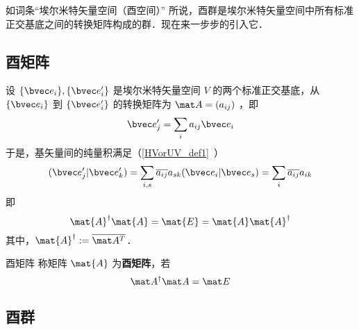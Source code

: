 
如词条“埃尔米特矢量空间（酉空间）” 所说，酉群是埃尔米特矢量空间中所有标准正交基底之间的转换矩阵构成的群．现在来一步步的引入它．
\subsection{酉矩阵}
设 $\{\bvec e_i\},\{\bvec e'_i\}$ 是埃尔米特矢量空间 $V$ 的两个标准正交基底，从 $\{\bvec e_i\}$ 到 $\{\bvec e'_i\}$ 的转换矩阵为 $\mat A=(a_{ij})$ ，即
\begin{equation}
\bvec e'_j=\sum_{i}a_{ij}\bvec e_i
\end{equation}
于是，基矢量间的纯量积满足（\autoref{HVorUV_def1}~）
\begin{equation}
(\bvec e'_j|\bvec e'_k)=\sum_{i,s}\overline{a_{ij}}a_{sk}(\bvec e_i|\bvec e_s)=\sum_{i}\overline{a_{ij}}a_{ik}
\end{equation}
即
\begin{equation}
\mat{A}^\dagger \mat{A}=\mat{E}=\mat{A} \mat{A}^\dagger
\end{equation}
其中，$\mat{A}^\dagger:=\overline{\mat A^T}$．
\begin{definition}{酉矩阵}
称矩阵 $\mat{A}$ 为\textbf{酉矩阵}，若
\begin{equation}
\mat A^\dagger \mat A=\mat E
\end{equation}
\end{definition}
\subsection{酉群}
